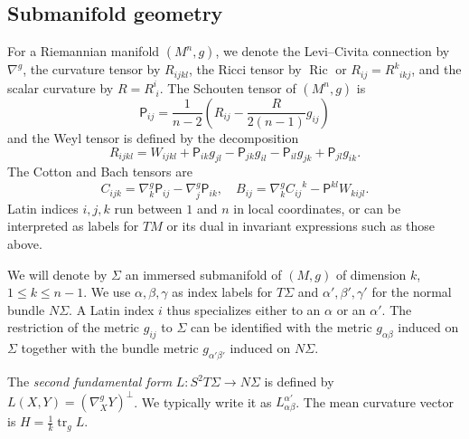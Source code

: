 \documentclass[11pt,letterpaper]{amsart}
\DeclareMathOperator{\tr}{tr}
\DeclareMathOperator{\Ric}{Ric}
\newcommand{\Sch}{\mathsf{P}}
\theoremstyle{definition}
\theoremstyle{remark}
\numberwithin{equation}{section}
\begin{document}
\subsection{Submanifold geometry}
For a Riemannian manifold $(M^n,g)$, we denote the Levi--Civita connection by $\nabla^{g}$, the curvature tensor by $R_{ijkl}$, the Ricci tensor by $\Ric$ or $R_{ij}=R^{k}_{\;\;ikj}$, and the scalar curvature by $R=R^i_{\;i}$. The Schouten tensor of $(M^n,g)$ is
\begin{equation*}
    \Sch_{ij}=\frac{1}{n-2}\left(R_{ij}-\frac{R}{2(n-1)}g_{ij}\right)
\end{equation*}
and the Weyl tensor is defined by the decomposition
\begin{equation*}
    R_{ijkl}=W_{ijkl}+\Sch_{ik}g_{jl}-\Sch_{jk}g_{il}-\Sch_{il}g_{jk}+\Sch_{jl}g_{ik}.
\end{equation*}
The Cotton and Bach tensors are
\begin{equation*}
    C_{ijk}=\nabla^g_k\Sch_{ij}-\nabla^g_j\Sch_{ik}, \quad B_{ij}=\nabla^g_kC_{ij}^{\;\;\;k}-\Sch^{kl}W_{kijl}.
\end{equation*}
Latin indices $i, j, k$ run between $1$ and $n$ in local coordinates, or can be interpreted as labels for $TM$ or its dual in invariant expressions such as those above.

We will denote by $\Sigma$ an immersed submanifold of $(M,g)$ of dimension $k$, $1\leq k\leq n-1$. We use $\alpha, \beta, \gamma$ as index labels for $T\Sigma$ and $\alpha', \beta', \gamma'$ for the normal bundle $N\Sigma$. A Latin index $i$ thus specializes either to an $\alpha$ or an $\alpha'$. The restriction of the metric $g_{ij}$ to $\Sigma$ can be identified with the metric $g_{\alpha\beta}$ induced on $\Sigma$ together with the bundle metric $g_{\alpha'\beta'}$ induced on $N\Sigma$.

The \textit{second fundamental form} $L:S^2T\Sigma\to N\Sigma$ is defined by $L(X,Y)=\left(\nabla^g_X Y\right)^{\perp}$. We typically write it as $L^{\alpha'}_{\alpha\beta}$. The mean curvature vector is $H=\frac{1}{k}\tr_g L$.
\end{document}
